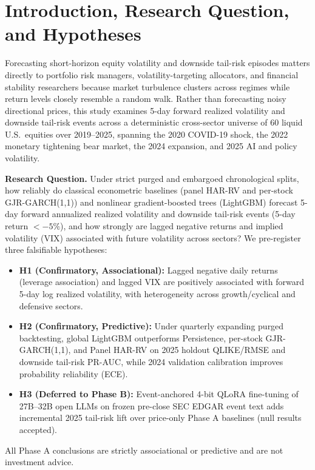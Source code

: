 \documentclass[11pt,a4paper]{article}
\begin{document}
\setcounter{page}{1}

\section{Introduction, Research Question, and Hypotheses}

Forecasting short-horizon equity volatility and downside tail-risk episodes
matters directly to portfolio risk managers, volatility-targeting allocators,
and financial stability researchers because market turbulence clusters across
regimes while return levels closely resemble a random walk. Rather than
forecasting noisy directional prices, this study examines 5-day forward realized
volatility and downside tail-risk events across a deterministic cross-sector
universe of 60 liquid U.S.\ equities over 2019--2025, spanning the
2020 COVID-19 shock, the 2022 monetary tightening bear market, the 2024
expansion, and 2025 AI and policy volatility.

\textbf{Research Question.} Under strict purged and embargoed chronological
splits, how reliably do classical econometric baselines (panel HAR-RV and
per-stock GJR-GARCH(1,1)) and nonlinear gradient-boosted trees (LightGBM)
forecast 5-day forward annualized realized volatility and downside tail-risk
events (5-day return $< -5\%$), and how strongly are lagged negative returns and
implied volatility (VIX) associated with future volatility across sectors? We
pre-register three falsifiable hypotheses:
\begin{itemize}\setlength{\itemsep}{0pt}\setlength{\parsep}{0pt}
\item \textbf{H1 (Confirmatory, Associational):} Lagged negative daily returns
(leverage association) and lagged VIX are positively associated with forward
5-day log realized volatility, with heterogeneity across growth/cyclical and
defensive sectors.
\item \textbf{H2 (Confirmatory, Predictive):} Under quarterly expanding purged
backtesting, global LightGBM outperforms Persistence, per-stock GJR-GARCH(1,1),
and Panel HAR-RV on 2025 holdout QLIKE/RMSE and downside tail-risk PR-AUC, while
2024 validation calibration improves probability reliability (ECE).
\item \textbf{H3 (Deferred to Phase B):} Event-anchored 4-bit QLoRA
fine-tuning of 27B--32B open LLMs on frozen pre-close SEC EDGAR event text adds
incremental 2025 tail-risk lift over price-only Phase A baselines (null results
accepted).
\end{itemize}
All Phase A conclusions are strictly associational or predictive and are not
investment advice.
\end{document}
